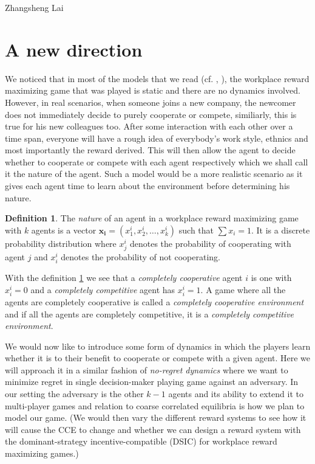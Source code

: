 \documentclass[a4paper,10pt]{article}
\theoremstyle{definition}
\newtheorem{defn}[thm]{Definition}
\begin{document}
\begin{flushright}
Zhangsheng Lai
\end{flushright}

\section*{A new direction}
We noticed that in most of the models that we read (cf.  \cite{Drago1991}, \cite{Chakravarti2015}), the workplace reward maximizing game that was played is static and there are no dynamics involved. However, in real scenarios, when someone joins a new company, the newcomer does not immediately decide to purely cooperate or compete, similiarly, this is true for his new colleagues too. After some interaction with each other over a time span, everyone will have a rough idea of everybody's work style, ethnics and most importantly the reward derived. This will then allow the agent to decide whether to cooperate or compete with each agent respectively which we shall call it the nature of the agent. Such a model would be a more realistic scenario as it gives each agent time to learn about the environment before determining his nature. 

\begin{defn}
The \emph{nature} of an agent in a workplace reward maximizing game with $k$ agents is a vector $\mathbf{x_i}=(x^i_1,x^i_2,\ldots, x^i_k)$ such that $\sum x_i=1$. It is a discrete probability distribution where $x^i_j$ denotes the probability of cooperating with agent $j$ and $x^i_i$ denotes the probability of not cooperating. \label{def:nature}
\end{defn}

With the definition \ref{def:nature} we see that a \emph{completely cooperative} agent $i$ is one with $x^i_i=0$ and a \emph{completely competitive} agent has $x^i_i=1$. A game where all the agents are completely cooperative is called a \emph{completely cooperative environment} and if all the agents are completely competitive, it is a \emph{completely competitive environment}.

We would now like to introduce some form of dynamics in which the players learn whether it is to their benefit to cooperate or compete with a given agent. Here we will approach it in a similar fashion of \emph{no-regret dynamics} where we want to minimize regret in single decision-maker playing game against an adversary. In our setting the adversary is the other $k-1$ agents and its ability to extend it to multi-player games and relation to coarse correlated equilibria is how we plan to model our game. (We would then vary the different reward systems to see how it will cause the CCE to change and whether we can design a reward system with the dominant-strategy incentive-compatible (DSIC) for workplace reward maximizing games.)
\end{document}
